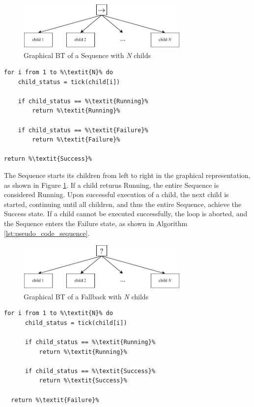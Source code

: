 \begin{figure}[h]
    \centering
    \includegraphics[width=0.75\textwidth]{figures/02_state_of_the_art/sequence.pdf}
    \caption{Graphical BT of a Sequence with \textit{N} childs}
    \label{fig:sequence}
\end{figure}

\begin{lstlisting}[float=h]
for i from 1 to %\textit{N}% do
    child_status = tick(child[i])
    
    if child_status == %\textit{Running}%
        return %\textit{Running}%
        
    if child_status == %\textit{Failure}%
        return %\textit{Failure}%

return %\textit{Success}%
\end{lstlisting}

The Sequence starts its children from left to right in the graphical representation, as shown in Figure \ref{fig:sequence}. If a child returns Running, the entire Sequence is considered Running. Upon successful execution of a child, the next child is started, continuing until all children, and thus the entire Sequence, achieve the Success state. If a child cannot be executed successfully, the loop is aborted, and the Sequence enters the Failure state, as shown in Algorithm \ref{lst:pseudo_code_sequence}.
  

\begin{figure}[h]
    \centering
    \includegraphics[width=0.75\textwidth]{figures/02_state_of_the_art/fallback.pdf}
    \caption{Graphical BT of a Fallback with \textit{N} childs}
    \label{fig:fallback}
  \end{figure}
  
  \begin{lstlisting}[float=h]
  for i from 1 to %\textit{N}% do
      child_status = tick(child[i])
      
      if child_status == %\textit{Running}%
          return %\textit{Running}%
          
      if child_status == %\textit{Success}%
          return %\textit{Success}%
  
  return %\textit{Failure}%
  \end{lstlisting}

